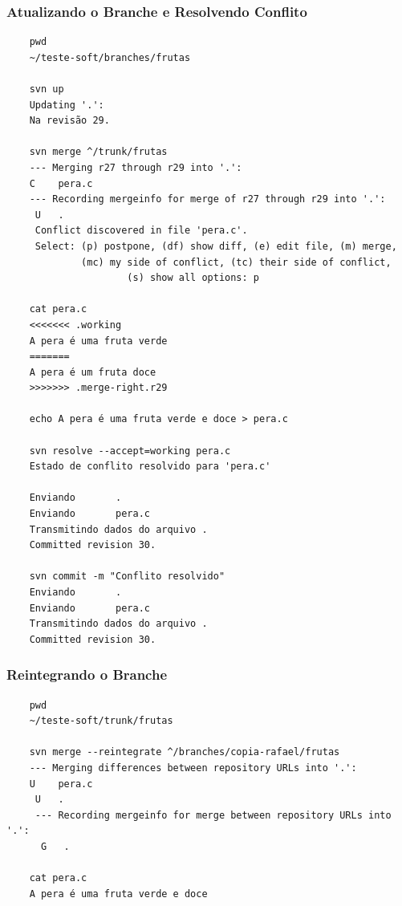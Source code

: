 \documentclass{beamer}
\begin{document}
\begin{frame}[fragile]
    \frametitle{Atualizando o Branche e Resolvendo Conflito}

    \begin{bash}{}
    {\tiny
    \begin{verbatim}
    pwd
    ~/teste-soft/branches/frutas

    svn up
    Updating '.':
    Na revisão 29.

    svn merge ^/trunk/frutas
    --- Merging r27 through r29 into '.':
    C    pera.c
    --- Recording mergeinfo for merge of r27 through r29 into '.':
     U   .
     Conflict discovered in file 'pera.c'.
     Select: (p) postpone, (df) show diff, (e) edit file, (m) merge,
             (mc) my side of conflict, (tc) their side of conflict,
                     (s) show all options: p

    cat pera.c
    <<<<<<< .working
    A pera é uma fruta verde
    =======
    A pera é um fruta doce
    >>>>>>> .merge-right.r29

    echo A pera é uma fruta verde e doce > pera.c

    svn resolve --accept=working pera.c
    Estado de conflito resolvido para 'pera.c'

    Enviando       .
    Enviando       pera.c
    Transmitindo dados do arquivo .
    Committed revision 30.

    svn commit -m "Conflito resolvido"
    Enviando       .
    Enviando       pera.c
    Transmitindo dados do arquivo .
    Committed revision 30.
    \end{verbatim}
    }
    \end{bash}

\end{frame}

\begin{frame}[fragile]
    \frametitle{Reintegrando o Branche}

    \begin{bash}{}
    {\tiny
    \begin{verbatim}
    pwd
    ~/teste-soft/trunk/frutas
    
    svn merge --reintegrate ^/branches/copia-rafael/frutas
    --- Merging differences between repository URLs into '.':
    U    pera.c
     U   .
     --- Recording mergeinfo for merge between repository URLs into '.':
      G   .

    cat pera.c
    A pera é uma fruta verde e doce
    \end{verbatim}
    }
    \end{bash}

\end{frame}
\end{document}
